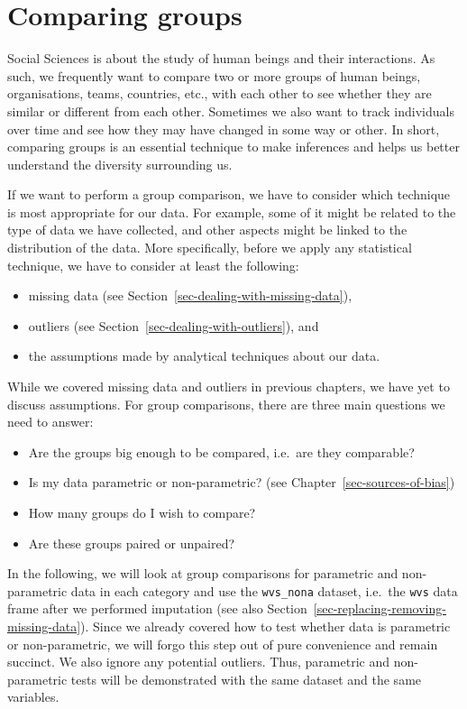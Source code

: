\documentclass[
  letterpaper,
]{krantz}
\begin{document}

\chapter{Comparing groups}\label{sec-comparing-groups}

Social Sciences is about the study of human beings and their
interactions. As such, we frequently want to compare two or more groups
of human beings, organisations, teams, countries, etc., with each other
to see whether they are similar or different from each other. Sometimes
we also want to track individuals over time and see how they may have
changed in some way or other. In short, comparing groups is an essential
technique to make inferences and helps us better understand the
diversity surrounding us.

If we want to perform a group comparison, we have to consider which
technique is most appropriate for our data. For example, some of it
might be related to the type of data we have collected, and other
aspects might be linked to the distribution of the data. More
specifically, before we apply any statistical technique, we have to
consider at least the following:

\begin{itemize}
\item
  missing data (see Section~\ref{sec-dealing-with-missing-data}),
\item
  outliers (see Section~\ref{sec-dealing-with-outliers}), and
\item
  the assumptions made by analytical techniques about our data.
\end{itemize}

While we covered missing data and outliers in previous chapters, we have
yet to discuss assumptions. For group comparisons, there are three main
questions we need to answer:

\begin{itemize}
\item
  Are the groups big enough to be compared, i.e.~are they comparable?
\item
  Is my data parametric or non-parametric? (see
  Chapter~\ref{sec-sources-of-bias})
\item
  How many groups do I wish to compare?
\item
  Are these groups paired or unpaired?
\end{itemize}

In the following, we will look at group comparisons for parametric and
non-parametric data in each category and use the \texttt{wvs\_nona}
dataset, i.e.~the \texttt{wvs} data frame after we performed imputation
(see also Section~\ref{sec-replacing-removing-missing-data}). Since we
already covered how to test whether data is parametric or
non-parametric, we will forgo this step out of pure convenience and
remain succinct. We also ignore any potential outliers. Thus, parametric
and non-parametric tests will be demonstrated with the same dataset and
the same variables.
\end{document}

